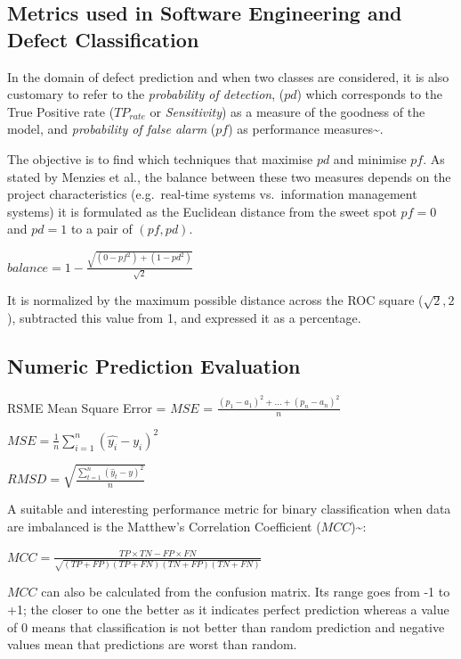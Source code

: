 \documentclass[]{book}
\begin{document}
\subsection{Metrics used in Software Engineering and Defect
Classification}\label{metrics-used-in-software-engineering-and-defect-classification}

In the domain of defect prediction and when two classes are considered,
it is also customary to refer to the \emph{probability of detection},
(\(pd\)) which corresponds to the True Positive rate (\(TP_{rate}\) or
\emph{Sensitivity}) as a measure of the goodness of the model, and
\emph{probability of false alarm} (\(pf\)) as performance
measures\textasciitilde{}\cite{Menzies07}.

The objective is to find which techniques that maximise \(pd\) and
minimise \(pf\). As stated by Menzies et al., the balance between these
two measures depends on the project characteristics (e.g.~real-time
systems vs.~information management systems) it is formulated as the
Euclidean distance from the sweet spot \(pf=0\) and \(pd=1\) to a pair
of \((pf,pd)\).

\(balance=1-\frac{\sqrt{(0-pf^2)+(1-pd^2)}}{\sqrt{2}}\)

It is normalized by the maximum possible distance across the ROC square
(\(\sqrt{2}, 2\)), subtracted this value from 1, and expressed it as a
percentage.

\subsection{Numeric Prediction
Evaluation}\label{numeric-prediction-evaluation}

RSME Mean Square Error = \(MSE\) =
\(\frac{(p_1-a_1)^2 + \ldots +(p_n-a_n)^2}{n}\)

\({MSE}=\frac{1}{n}\sum_{i=1}^n(\hat{y_i} - y_i)^2\)

\({RMSD}=\sqrt{\frac{\sum_{t=1}^n (\hat y_t - y)^2}{n}}\)

A suitable and interesting performance metric for binary classification
when data are imbalanced is the Matthew's Correlation Coefficient
(\(MCC\))\textasciitilde{}\cite{Matthews1975Comparison}:

\(MCC=\frac{TP\times TN - FP\times FN}{\sqrt{(TP+FP)(TP+FN)(TN+FP)(TN+FN)}}\)

\(MCC\) can also be calculated from the confusion matrix. Its range goes
from -1 to +1; the closer to one the better as it indicates perfect
prediction whereas a value of 0 means that classification is not better
than random prediction and negative values mean that predictions are
worst than random.
\end{document}
